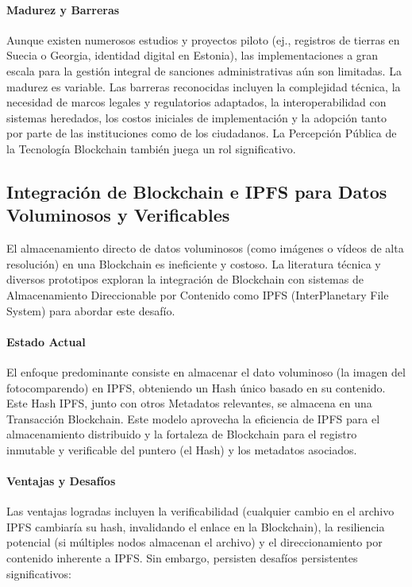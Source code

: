 \paragraph{Madurez y Barreras}
Aunque existen numerosos estudios y proyectos piloto (ej., registros de tierras en Suecia o Georgia, identidad digital en Estonia), las implementaciones a gran escala para la gestión integral de sanciones administrativas aún son limitadas. La madurez es variable. Las barreras reconocidas incluyen la complejidad técnica, la necesidad de marcos legales y regulatorios adaptados, la interoperabilidad con sistemas heredados, los costos iniciales de implementación y la adopción tanto por parte de las instituciones como de los ciudadanos. La Percepción Pública de la Tecnología Blockchain también juega un rol significativo. 

\subsection{Integración de Blockchain e IPFS para Datos Voluminosos y Verificables} 

El almacenamiento directo de datos voluminosos (como imágenes o vídeos de alta resolución) en una Blockchain es ineficiente y costoso. La literatura técnica y diversos prototipos exploran la integración de Blockchain con sistemas de Almacenamiento Direccionable por Contenido como IPFS (InterPlanetary File System) para abordar este desafío. 

\paragraph{Estado Actual} El enfoque predominante consiste en almacenar el dato voluminoso (la imagen del fotocomparendo) en IPFS, obteniendo un Hash único basado en su contenido. Este Hash IPFS, junto con otros Metadatos relevantes, se almacena en una Transacción Blockchain. Este modelo aprovecha la eficiencia de IPFS para el almacenamiento distribuido y la fortaleza de Blockchain para el registro inmutable y verificable del puntero (el Hash) y los metadatos asociados. 

\paragraph{Ventajas y Desafíos} Las ventajas logradas incluyen la verificabilidad (cualquier cambio en el archivo IPFS cambiaría su hash, invalidando el enlace en la Blockchain), la resiliencia potencial (si múltiples nodos almacenan el archivo) y el direccionamiento por contenido inherente a IPFS. Sin embargo, persisten desafíos persistentes significativos: 

